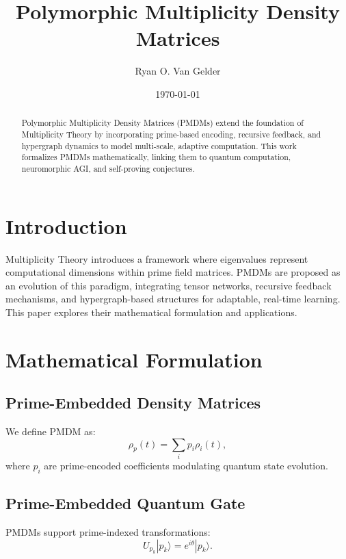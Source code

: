 \documentclass{article}
\theoremstyle{plain}
\begin{document}
\title{Polymorphic Multiplicity Density Matrices}

\author{Ryan O. Van Gelder}
\date{\today}

\maketitle

\begin{abstract}
Polymorphic Multiplicity Density Matrices (PMDMs) extend the foundation of Multiplicity Theory by incorporating prime-based encoding, recursive feedback, and hypergraph dynamics to model multi-scale, adaptive computation. This work formalizes PMDMs mathematically, linking them to quantum computation, neuromorphic AGI, and self-proving conjectures.
\end{abstract}

\section{Introduction}
Multiplicity Theory introduces a framework where eigenvalues represent computational dimensions within prime field matrices. PMDMs are proposed as an evolution of this paradigm, integrating tensor networks, recursive feedback mechanisms, and hypergraph-based structures for adaptable, real-time learning. This paper explores their mathematical formulation and applications.

\section{Mathematical Formulation}
\subsection{Prime-Embedded Density Matrices}
We define PMDM as:
\begin{equation}
    \rho_p(t) = \sum_{i} p_i \rho_i(t),
\end{equation}
where $p_i$ are prime-encoded coefficients modulating quantum state evolution.
\subsection{Prime-Embedded Quantum Gate}
PMDMs support prime-indexed transformations:
\begin{equation}
    U_{p_k} |p_k\rangle = e^{i\theta} |p_k\rangle.
\end{equation}
\end{document}
